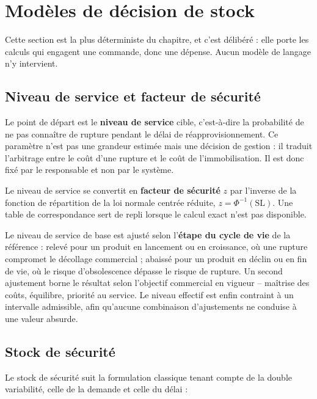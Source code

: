\section{Modèles de décision de stock}
\label{sec:decision-stock}

Cette section est la plus déterministe du chapitre, et c'est délibéré : elle porte les calculs qui engagent une commande, donc une dépense. Aucun modèle de langage n'y intervient.

\subsection{Niveau de service et facteur de sécurité}

Le point de départ est le \textbf{niveau de service} cible, c'est-à-dire la probabilité de ne pas connaître de rupture pendant le délai de réapprovisionnement. Ce paramètre n'est pas une grandeur estimée mais une décision de gestion : il traduit l'arbitrage entre le coût d'une rupture et le coût de l'immobilisation. Il est donc fixé par le responsable et non par le système.

Le niveau de service se convertit en \textbf{facteur de sécurité} $z$ par l'inverse de la fonction de répartition de la loi normale centrée réduite, $z = \Phi^{-1}(\mathrm{SL})$. Une table de correspondance sert de repli lorsque le calcul exact n'est pas disponible.

Le niveau de service de base est ajusté selon l'\textbf{étape du cycle de vie} de la référence : relevé pour un produit en lancement ou en croissance, où une rupture compromet le décollage commercial ; abaissé pour un produit en déclin ou en fin de vie, où le risque d'obsolescence dépasse le risque de rupture. Un second ajustement borne le résultat selon l'objectif commercial en vigueur -- maîtrise des coûts, équilibre, priorité au service. Le niveau effectif est enfin contraint à un intervalle admissible, afin qu'aucune combinaison d'ajustements ne conduise à une valeur absurde.

\subsection{Stock de sécurité}

Le stock de sécurité suit la formulation classique tenant compte de la double variabilité, celle de la demande et celle du délai \cite{silver2016inventory,axsater2015inventory} :

